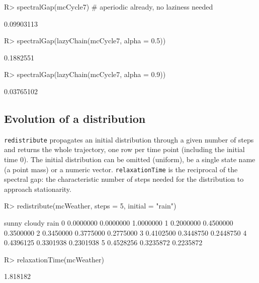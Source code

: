 \documentclass[
  nojss]{jss}
\begin{document}
\begin{CodeChunk}
\begin{CodeInput}
R> spectralGap(mcCycle7) # aperiodic already, no laziness needed
\end{CodeInput}
\begin{CodeOutput}
[1] 0.09903113
\end{CodeOutput}
\begin{CodeInput}
R> spectralGap(lazyChain(mcCycle7, alpha = 0.5))
\end{CodeInput}
\begin{CodeOutput}
[1] 0.1882551
\end{CodeOutput}
\begin{CodeInput}
R> spectralGap(lazyChain(mcCycle7, alpha = 0.9))
\end{CodeInput}
\begin{CodeOutput}
[1] 0.03765102
\end{CodeOutput}
\end{CodeChunk}

\subsection{Evolution of a distribution}\label{evolution-of-a-distribution}

\texttt{redistribute} propagates an initial distribution through a given number of
steps and returns the whole trajectory, one row per time point (including the
initial time \(0\)). The initial distribution can be omitted (uniform), be a
single state name (a point mass) or a numeric vector. \texttt{relaxationTime} is the
reciprocal of the spectral gap: the characteristic number of steps needed for
the distribution to approach stationarity.

\begin{CodeChunk}
\begin{CodeInput}
R> redistribute(mcWeather, steps = 5, initial = "rain")
\end{CodeInput}
\begin{CodeOutput}
      sunny    cloudy      rain
0 0.0000000 0.0000000 1.0000000
1 0.2000000 0.4500000 0.3500000
2 0.3450000 0.3775000 0.2775000
3 0.4102500 0.3448750 0.2448750
4 0.4396125 0.3301938 0.2301938
5 0.4528256 0.3235872 0.2235872
\end{CodeOutput}
\begin{CodeInput}
R> relaxationTime(mcWeather)
\end{CodeInput}
\begin{CodeOutput}
[1] 1.818182
\end{CodeOutput}
\end{CodeChunk}
\end{document}

